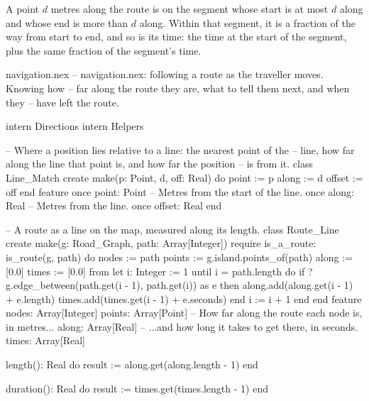 \begin{center}
\end{center}

A point $d$ metres along the route is on the segment whose start is at
most $d$ along and whose end is more than $d$ along. Within that segment,
it is a fraction of the way from start to end, and so is its time: the
time at the start of the segment, plus the same fraction of the segment's
time.

\begin{newfile}{navigation.nex}
-- navigation.nex: following a route as the traveller moves. Knowing how
-- far along the route they are, what to tell them next, and when they
-- have left the route.

intern Directions
intern Helpers

-- Where a position lies relative to a line: the nearest point of the
-- line, how far along the line that point is, and how far the position
-- is from it.
class Line_Match
create
  make(p: Point, d, off: Real) do
    point := p
    along := d
    offset := off
  end
feature
  once point: Point
  -- Metres from the start of the line.
  once along: Real
  -- Metres from the line.
  once offset: Real
end

-- A route as a line on the map, measured along its length.
class Route_Line
create
  make(g: Road_Graph, path: Array[Integer])
  require
    is_a_route: is_route(g, path)
  do
    nodes := path
    points := g.island.points_of(path)
    along := [0.0]
    times := [0.0]
    from
      let i: Integer := 1
    until
      i = path.length
    do
      if ?g.edge_between(path.get(i - 1), path.get(i)) as e then
        along.add(along.get(i - 1) + e.length)
        times.add(times.get(i - 1) + e.seconds)
      end
      i := i + 1
    end
  end
feature
  nodes: Array[Integer]
  points: Array[Point]
  -- How far along the route each node is, in metres...
  along: Array[Real]
  -- ...and how long it takes to get there, in seconds.
  times: Array[Real]

  length(): Real do
    result := along.get(along.length - 1)
  end

  duration(): Real do
    result := times.get(times.length - 1)
  end
\end{newfile}

